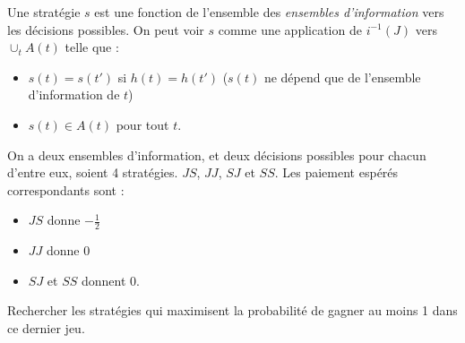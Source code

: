 Une stratégie $s$ est une fonction de l'ensemble des {\em
ensembles d'information} vers les décisions possibles. On peut
voir $s$ comme une application de $i^{-1}(J)$ vers $\cup_t A(t)$
telle que :%
\begin{itemize}
\item $s(t)= s(t')$ si $h(t) = h(t')$ ($s(t)$ ne dépend que de
l'ensemble d'information de $t$)%
\item $s(t)\in A(t)$ pour tout $t$.
\end{itemize}

\begin{exemple}
On a deux ensembles d'information, et deux décisions possibles
pour chacun d'entre eux, soient 4 stratégies. $JS$, $JJ$, $SJ$ et
$SS$. Les paiement espérés correspondants sont :
\begin{itemize}
\item $JS$ donne $-\frac12$%
\item $JJ$ donne $0$%
\item $SJ$ et $SS$ donnent $0$.
\end{itemize}
\end{exemple}

\begin{exemple}
Rechercher les stratégies qui maximisent la probabilité de gagner
au moins 1 dans ce dernier jeu.
\end{exemple}
